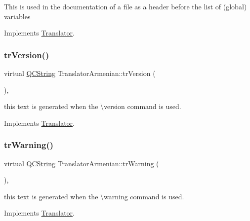 This is used in the documentation of a file as a header before the list of (global) variables 

Implements \mbox{\hyperlink{class_translator}{Translator}}.

\mbox{\label{class_translator_armenian_ae982e5967c184f03960fae6f62cd98bb}} 
\subsubsection{\texorpdfstring{trVersion()}{trVersion()}}
{\footnotesize\ttfamily virtual \mbox{\hyperlink{class_q_c_string}{Q\+C\+String}} Translator\+Armenian\+::tr\+Version (\begin{DoxyParamCaption}{ }\end{DoxyParamCaption})\hspace{0.3cm}{\ttfamily [inline]}, {\ttfamily [virtual]}}

this text is generated when the \textbackslash{}version command is used. 

Implements \mbox{\hyperlink{class_translator}{Translator}}.

\mbox{\label{class_translator_armenian_af1ad319dc44fd237945509e0b519d7ca}} 
\subsubsection{\texorpdfstring{trWarning()}{trWarning()}}
{\footnotesize\ttfamily virtual \mbox{\hyperlink{class_q_c_string}{Q\+C\+String}} Translator\+Armenian\+::tr\+Warning (\begin{DoxyParamCaption}{ }\end{DoxyParamCaption})\hspace{0.3cm}{\ttfamily [inline]}, {\ttfamily [virtual]}}

this text is generated when the \textbackslash{}warning command is used. 

Implements \mbox{\hyperlink{class_translator}{Translator}}.

\mbox{\label{class_translator_armenian_aec9d1f037c641b6dc398033668aff078}} 
